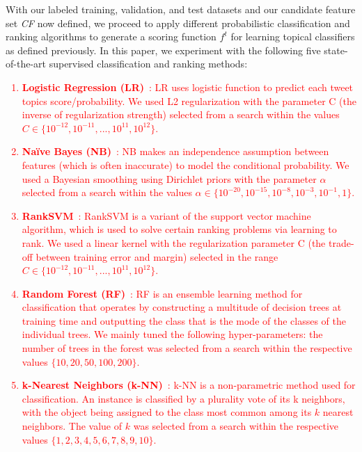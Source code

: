 With our labeled training, validation, and test datasets 
and our candidate feature set \textit{CF} now defined, we proceed to apply different probabilistic classification and ranking
algorithms to generate a scoring function $f^t$ for learning topical classifiers 
as defined previously.
In this paper, we experiment with 
the following five state-of-the-art supervised classification and ranking methods:
\textcolor{red}{
\begin{enumerate}
\item {\bf Logistic Regression (LR)}~\cite{liblinear}: LR uses logistic function to predict each tweet topics score/probability. We used L2 regularization with the parameter C (the inverse of regularization strength) selected from a search within the values $C \in \{10^{-12}, 10^{-11}, ..., 10^{11}, 10^{12}\}$.
\item {\bf Na\"{i}ve Bayes (NB)}~\cite{mccallum98nb}: NB makes an independence assumption between features (which is often inaccurate) to model the conditional probability. We used a Bayesian smoothing using Dirichlet priors with the parameter $\alpha$ selected from a search within the values $\alpha \in \{10^{-20}, 10^{-15}, 10^{-8}, 10^{-3}, 10^{-1}, 1\}$.
\item {\bf RankSVM}~\cite{largescale_ranksvm}: RankSVM is a variant of the support vector machine algorithm, which is used to solve certain ranking problems via learning to rank.  We used a linear kernel with the regularization parameter C (the trade-off between training error and margin) selected in the range $C \in \{10^{-12}, 10^{-11}, ..., 10^{11}, 10^{12}\}$.
\item {\bf Random Forest (RF)}~\cite{Breiman2001}: RF is an ensemble learning method for classification that operates by constructing a multitude of decision trees at training time and outputting the class that is the mode of the classes of the individual trees. We mainly tuned the following hyper-parameters: the number of trees in the forest was selected from a search within the respective values $\{10, 20, 50, 100, 200\}$.
\item {\bf k-Nearest Neighbors (k-NN)}~\cite{Aha1991}: k-NN is a non-parametric method used for classification. An instance is classified by a plurality vote of its k neighbors, with the object being assigned to the class most common among its $k$ nearest neighbors. The value of $k$ was selected from a search within the respective values $\{1, 2, 3, 4, 5, 6, 7, 8, 9, 10\}$.
\end{enumerate}
}

